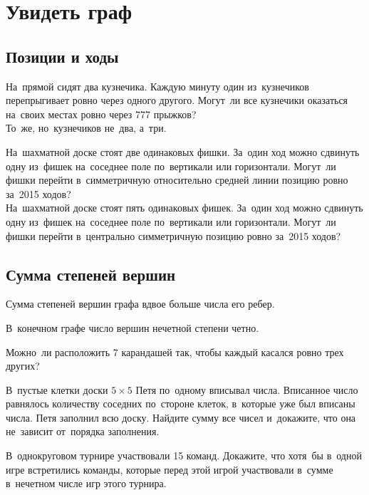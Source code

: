 
\section*{Увидеть граф}



\subsection*{Позиции и ходы}

\begin{problems}

\item
\subproblem
На~прямой сидят два кузнечика.
Каждую минуту один из~кузнечиков перепрыгивает ровно через одного другого.
Могут~ли все кузнечики оказаться на~своих местах ровно через 777 прыжков?
\\
\subproblem
То~же, но~кузнечиков не~два, а~три.

\item
\subproblem
На~шахматной доске стоят две одинаковых фишки.
За~один ход можно сдвинуть одну из~фишек на~соседнее поле по~вертикали или
горизонтали.
Могут~ли фишки перейти в~симметричную относительно средней линии позицию ровно
за~2015 ходов?
\\
\subproblem
На~шахматной доске стоят пять одинаковых фишек.
За~один ход можно сдвинуть одну из~фишек на~соседнее поле по~вертикали или
горизонтали.
Могут~ли фишки перейти в~центрально симметричную позицию ровно за~2015 ходов?

\end{problems}

\subsection*{Сумма степеней вершин}

Сумма степеней вершин графа вдвое больше числа его ребер.

В~конечном графе число вершин нечетной степени четно.

\begin{problems}

\item
Можно~ли расположить 7 карандашей так, чтобы каждый касался ровно трех других?

\item
В~пустые клетки доски $5 \times 5$ Петя по~одному вписывал числа.
Вписанное число равнялось количеству соседних по~стороне клеток, в~которые уже
был вписаны числа.
Петя заполнил всю доску.
Найдите сумму все чисел и~докажите, что она не~зависит от~порядка заполнения.

\item
В~однокруговом турнире участвовали 15 команд.
Докажите, что хотя~бы в~одной игре встретились команды, которые перед этой
игрой участвовали в~сумме в~нечетном числе игр этого турнира.

\end{problems}


